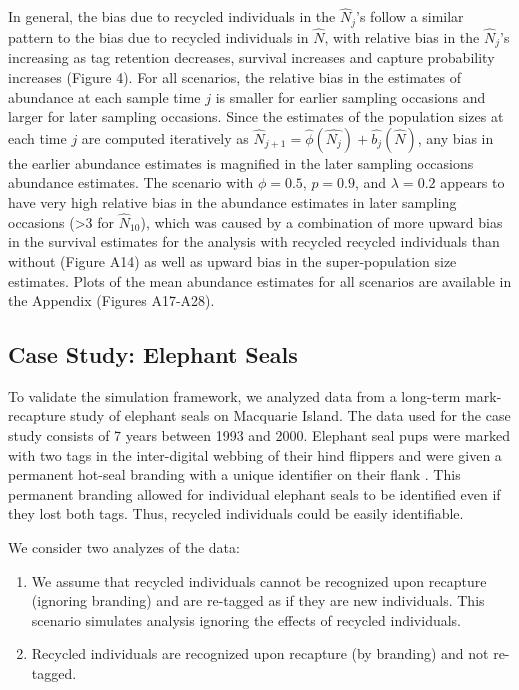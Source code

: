 \documentclass[]{article}
\begin{document}
In general, the bias due to recycled individuals in the \(\hat{N}_j\)'s
follow a similar pattern to the bias due to recycled individuals in
\(\hat{N}\), with relative bias in the \(\hat{N}_j\)'s increasing as tag
retention decreases, survival increases and capture probability
increases (Figure 4). For all scenarios, the relative bias in the
estimates of abundance at each sample time \(j\) is smaller for earlier
sampling occasions and larger for later sampling occasions. Since the
estimates of the population sizes at each time \(j\) are computed
iteratively as
\(\hat{N}_{j+1}=\hat{\phi}(\hat{N_j})+\hat{b_j}(\hat{N})\), any bias in
the earlier abundance estimates is magnified in the later sampling
occasions abundance estimates. The scenario with \(\phi=0.5\),
\(p=0.9\), and \(\lambda=0.2\) appears to have very high relative bias
in the abundance estimates in later sampling occasions (\textgreater{}3
for \(\hat{N}_{10}\)), which was caused by a combination of more upward
bias in the survival estimates for the analysis with recycled recycled
individuals than without (Figure A14) as well as upward bias in the
super-population size estimates. Plots of the mean abundance estimates
for all scenarios are available in the Appendix (Figures A17-A28).

\subsection{Case Study: Elephant
Seals}\label{case-study-elephant-seals-1}


To validate the simulation framework, we analyzed data from a long-term
mark-recapture study of elephant seals on Macquarie Island. The data
used for the case study consists of 7 years between 1993 and 2000.
Elephant seal pups were marked with two tags in the inter-digital
webbing of their hind flippers and were given a permanent hot-seal
branding with a unique identifier on their flank \citep{McMahon:2009}. This
permanent branding allowed for individual elephant seals to be
identified even if they lost both tags. Thus, recycled individuals could
be easily identifiable.

We consider two analyzes of the data:

\begin{enumerate}
\def\labelenumi{\arabic{enumi}.}
\item
  We assume that recycled individuals cannot be recognized upon
  recapture (ignoring branding) and are re-tagged as if they are new
  individuals. This scenario simulates analysis ignoring the effects of
  recycled individuals.
\item
  Recycled individuals are recognized upon recapture (by branding) and
  not re-tagged.
\end{enumerate}
\end{document}
